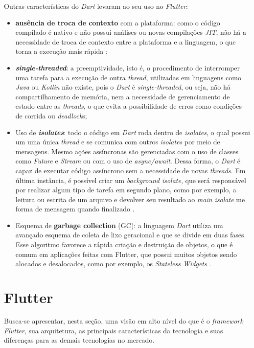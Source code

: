 Outras características do \textit{Dart} levaram ao seu uso no \textit{Flutter}:

\begin{itemize}
  \item \textbf{ausência de troca de contexto} com a plataforma: como o código compilado é nativo e não possui análises ou novas compilações \textit{JIT}, não há a necessidade de troca de contexto entre a plataforma e a linguagem, o que torna a execução mais rápida \cite{leler2017flutterdart};
  \item \textbf{\textit{single-threaded}}: a preemptividade, isto é, o procedimento de interromper uma tarefa para a execução de outra \textit{thread}, utilizadas em linguagens como \textit{Java} ou \textit{Kotlin} não existe, pois o \textit{Dart} é \textit{single-threaded}, ou seja, não há compartilhamento de memória, nem a necessidade de gerenciamento de estado entre as \textit{threads}, o que evita a possibilidade de erros como condições de corrida ou \textit{deadlock}s;
  \item Uso de \textbf{\textit{isolates}}: todo o código em \textit{Dart} roda dentro de \textit{isolates}, o qual possui um uma única \textit{thread} e se comunica com outros \textit{isolates} por meio de mensagens. Mesmo ações assíncronas são gerenciadas com o uso de classes como \textit{Future} e \textit{Stream} ou com o uso de \textit{async/await}. Dessa forma, o \textit{Dart} é capaz de executar código assíncrono sem a necessidade de novas \textit{threads}. Em última instância, é possível criar um \textit{background isolate}, que será responsável por realizar algum tipo de tarefa em segundo plano, como por exemplo, a leitura ou escrita de um arquivo e devolver seu resultado ao \textit{main isolate} me forma de mensagem quando finalizado \cite{dart-language} \cite{dart-concurrency}.
  \item Esquema de \textbf{garbage collection} (GC): a linguagem \textit{Dart} utiliza um avançado esquema de coleta de lixo geracional e que se divide em duas fases. Esse algoritmo favorece a rápida criação e destruição de objetos, o que é comum em aplicações feitas com Flutter, que possui muitos objetos sendo alocados e desalocados, como por exemplo, os \textit{Stateless Widgets} \cite{leler2017flutterdart} \cite{matt2019garbagecollector}.
\end{itemize}


\section[\textit{Flutter}]{Flutter}
Busca-se apresentar, nesta seção, uma visão em alto nível do que é o \textit{framework Flutter}, sua arquitetura, as principais características da tecnologia e suas diferenças para as demais tecnologias no mercado.

